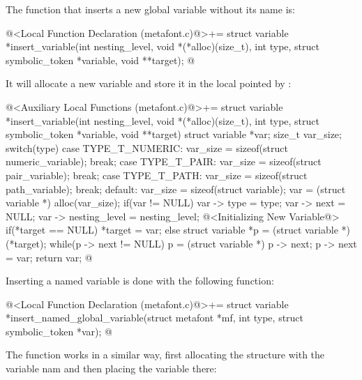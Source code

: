 The function that inserts a new global variable without its name is:

\iniciocodigo
@<Local Function Declaration (metafont.c)@>+=
struct variable *insert_variable(int nesting_level,
                                 void *(*alloc)(size_t),
                                 int type,
                                 struct symbolic_token *variable,
                                 void **target);
@
\fimcodigo

It will allocate a new variable and store it in the local pointed
by :

\iniciocodigo
@<Auxiliary Local Functions (metafont.c)@>+=
struct variable *insert_variable(int nesting_level,
                                 void *(*alloc)(size_t),
                                 int type,
                                 struct symbolic_token *variable,
                                 void **target){
  struct variable *var;
  size_t var_size;
  switch(type){
    case TYPE_T_NUMERIC:
      var_size = sizeof(struct numeric_variable);
      break;
    case TYPE_T_PAIR:
      var_size = sizeof(struct pair_variable);
      break;
    case TYPE_T_PATH:
      var_size = sizeof(struct path_variable);
      break;
    default:
      var_size = sizeof(struct variable);
  }
  var = (struct variable *) alloc(var_size);
  if(var != NULL){
    var -> type = type;
    var -> next = NULL;
    var -> nesting_level = nesting_level;
    @<Initializing New Variable@>
  }
  if(*target == NULL)
    *target = var;
  else{
    struct variable *p = (struct variable *) (*target);
    while(p -> next != NULL)
      p = (struct variable *) p -> next;
    p -> next = var;
  }
  return var;
}
@
\fimcodigo

Inserting a named variable is done with the following function:

\iniciocodigo
@<Local Function Declaration (metafont.c)@>+=
struct variable *insert_named_global_variable(struct metafont *mf,
                                             int type,
                                             struct symbolic_token *var);
@
\fimcodigo

The function works in a similar way, first allocating the structure
with the variable nam and then placing the variable there:

